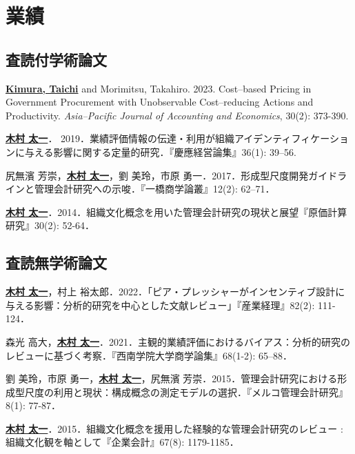 \documentclass[letterpaper,uplatex]{article}
\renewenvironment{itemize}{
  \begin{list}{}{
    \setlength{\leftmargin}{1.5em}
  }
}{
  \end{list}
}
\begin{document}
\section*{業績}

\subsection*{査読付学術論文}

\begin{itemize}
    \item \underline{\textbf{Kimura, Taichi}} and Morimitsu, Takahiro. 2023. Cost--based Pricing in Government Procurement with Unobservable Cost--reducing Actions and Productivity. \textit{Asia--Pacific Journal of Accounting and Economics}, 30(2): 373-390.
    
    \item \underline{\textbf{木村 太一}}． 2019．業績評価情報の伝達・利用が組織アイデンティフィケーションに与える影響に関する定量的研究．『慶應経営論集』36(1): 39--56.

	\item 尻無濱 芳崇，\underline{\textbf{木村 太一}}，劉 美玲，市原 勇一．2017．形成型尺度開発ガイドラインと管理会計研究への示唆．『一橋商学論叢』12(2): 62--71．

	\item \underline{\textbf{木村 太一}}．2014．組織文化概念を用いた管理会計研究の現状と展望『原価計算研究』30(2): 52-64．
\end{itemize}

\subsection*{査読無学術論文}

\begin{itemize}
    \item \underline{\textbf{木村 太一}}，村上 裕太郎．2022．「ピア・プレッシャーがインセンティブ設計に与える影響：分析的研究を中心とした文献レビュー」『産業経理』82(2): 111-124．

    \item 森光 高大，\underline{\textbf{木村 太一}}．2021．主観的業績評価におけるバイアス：分析的研究のレビューに基づく考察．『西南学院大学商学論集』68(1-2): 65--88．
    
	\item 劉 美玲，市原 勇一，\underline{\textbf{木村 太一}}，尻無濱 芳崇．2015．管理会計研究における形成型尺度の利用と現状：構成概念の測定モデルの選択．『メルコ管理会計研究』8(1): 77-87．

	\item \underline{\textbf{木村 太一}}．2015．組織文化概念を援用した経験的な管理会計研究のレビュー : 組織文化観を軸として『企業会計』67(8): 1179-1185．
\end{itemize}
\end{document}
